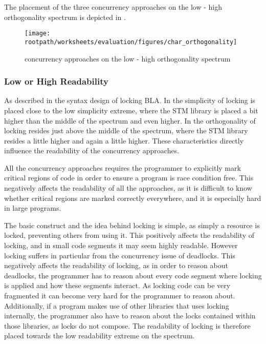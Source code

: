 The placement of the three concurrency approaches on the low - high orthogonality spectrum is depicted in .


\begin{figure}[htbp]
\centering
 \texttt{[image: \\rootpath/worksheets/evaluation/figures/char\_orthogonality]} 
 \caption{concurrency approaches on the low - high orthogonality spectrum}
\label{fig:char_orthogonality}
\end{figure}

\subsubsection{Low or High Readability}\label{subsec:char_readability}
As described in  the syntax design of locking BLA. In  the simplicity of locking is placed close to the low simplicity extreme, where the \ac{STM} library is placed a bit higher than the middle of the spectrum and \stmname even higher. In  the orthogonality of locking resides just above the middle of the spectrum, where the \ac{STM} library resides a little higher and \stmname again a little higher. These characteristics directly influence the readability of the concurrency approaches.

All the concurrency approaches requires the programmer to explicitly mark critical regions of code in order to ensure a program is race condition free. This negatively affects the readability of all the approaches, as it is difficult to know whether critical regions are marked correctly everywhere, and it is especially hard in large programs.

The basic  construct and the idea behind locking is simple, as simply a resource is locked, preventing others from using it. This positively affects the readability of locking, and in small code segments it may seem highly readable. However locking suffers in particular from the concurrency issue of deadlocks. This negatively affects the readability of locking, as in order to reason about deadlocks, the programmer has to reason about every code segment where locking is applied and how these segments interact. As locking code can be very fragmented it can become very hard for the programmer to reason about. Additionally, if a program makes use of other libraries that uses locking internally, the programmer also have to reason about the locks contained within those libraries, as locks do not compose. The readability of locking is therefore placed towards the low readability extreme on the spectrum.


